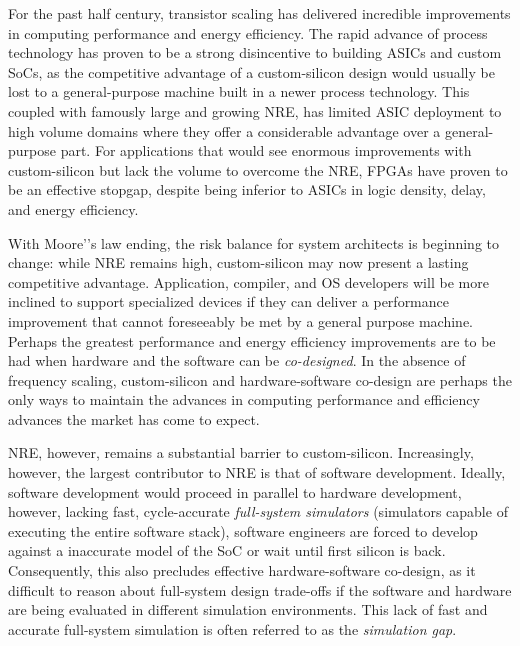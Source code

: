 For the past half century, transistor scaling has delivered incredible
improvements in computing performance and energy efficiency. The rapid advance
of process technology has proven to be a strong disincentive to building ASICs and custom SoCs, 
as the competitive advantage of a custom-silicon design would usually be lost
to a general-purpose machine built in a newer process technology. This coupled
with famously large and growing NRE, has limited ASIC deployment to high volume
domains where they offer a considerable advantage over a general-purpose part.
For applications that would see enormous improvements with custom-silicon but
lack the volume to overcome the NRE, FPGAs have proven to be an effective
stopgap, despite being inferior to ASICs in logic density, delay, and energy
efficiency.

With Moore'’s law ending, the risk balance for system architects is beginning
to change: while NRE remains high, custom-silicon may now present a lasting
competitive advantage.  Application, compiler, and OS developers will be more
inclined to support specialized devices if they can deliver a performance
improvement that cannot foreseeably be met by a general purpose machine.
Perhaps the greatest performance and energy efficiency improvements are to be
had when hardware and the software can be \emph{co-designed}.  In the absence
of frequency scaling, custom-silicon and hardware-software co-design are
perhaps the only ways to maintain the advances in computing performance and
efficiency advances the market has come to expect.

NRE, however, remains a substantial barrier to custom-silicon.
Increasingly, however, the largest contributor to NRE is that of software
development.  Ideally, software development would proceed in parallel to
hardware development, however, lacking fast, cycle-accurate \emph{full-system
simulators} (simulators capable of executing the entire software stack),
software engineers are forced to develop against a inaccurate model of the SoC
or wait until first silicon is back.  Consequently, this also precludes
effective hardware-software co-design, as it difficult to reason about
full-system design trade-offs if the software and hardware are being evaluated
in different simulation environments. This lack of fast and accurate
full-system simulation is often referred to as the \emph{simulation gap}.

